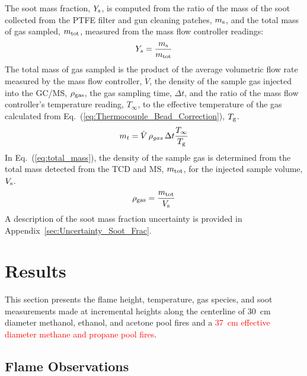 \documentclass[12pt]{article}
\begin{document}
The soot mass fraction, $Y_{\rm s}$, is computed from the ratio of the mass of the soot collected from the PTFE filter and gun cleaning patches, $m_{\rm s}$, and the total mass of gas sampled, $m_{\rm tot}$, measured from the mass flow controller readings:
\begin{equation}\label{eq:soot_mass_frac}
Y_{s}= \frac{m_{\rm s}}{m_{\rm tot}}
\end{equation}
The total mass of gas sampled is the product of the average volumetric flow rate measured by the mass flow controller, $\dot{V}$, the density of the sample gas injected into the GC/MS, $\rho_{\rm gas}$, the gas sampling time, $\Delta t$, and the ratio of the mass flow controller's temperature reading, $T_{\infty}$, to the effective temperature of the gas calculated from Eq.~(\ref{eq:Thermocouple_Bead_Correction}), $T_{\rm g}$. 
\begin{equation}\label{eq:total_mass}
m_{t}= \dot{V} \, \rho_{gas}\, \Delta t \frac{T_{\infty}}{T_{\rm g}}
\end{equation}
In Eq.~(\ref{eq:total_mass}), the density of the sample gas is determined from the total mass detected from the TCD and MS, $m_{\rm tot}$, for the injected sample volume, $V_{\rm s}$.
\begin{equation}\label{eq:gas_density}
\rho_{\rm gas}= \frac{m_{\rm tot}}{V_{\rm s}}
\end{equation}
A description of the soot mass fraction uncertainty is provided in Appendix~\ref{sec:Uncertainty_Soot_Frac}.


\clearpage

\section{Results}
\label{sec:Results}

This section presents the flame height, temperature, gas species, and soot measurements made at incremental heights along the centerline of 30~cm diameter methanol, ethanol, and acetone pool fires and a \textcolor{red}{37~cm effective diameter methane and propane pool fires}.

\subsection{Flame Observations}
\label{ssec:Flame_Observations}
\end{document}
